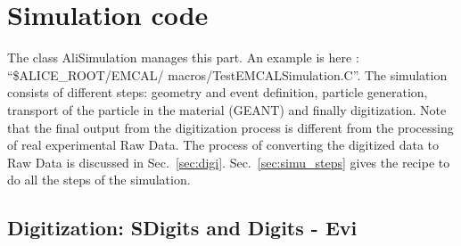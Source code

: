 \section{Simulation code}

The class AliSimulation manages this part. An example is here : ``\$ALICE\_ROOT/EMCAL/
macros/TestEMCALSimulation.C''. The simulation
consists of different steps: geometry and event definition, particle
generation, transport of the particle in the material (GEANT) and
finally digitization. Note that the final output from the digitization
process is different from the processing of real experimental Raw Data. The process
of converting the digitized data to Raw Data is discussed in Sec.~\ref{sec:digi}.
Sec.~\ref{sec:simu_steps} gives the recipe to do all the steps of the simulation.






\clearpage


\subsection{Digitization: SDigits and Digits - Evi \label{sec:digi}}


